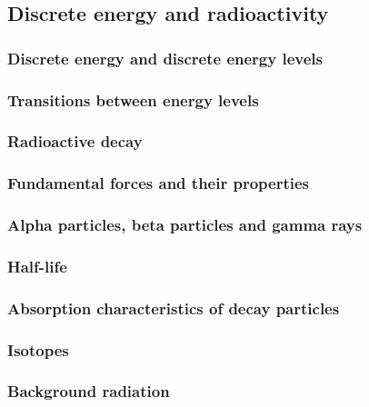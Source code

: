 \subsection{Discrete energy and radioactivity}

\subsubsection{Discrete energy and discrete energy levels}


\subsubsection{Transitions between energy levels}


\subsubsection{Radioactive decay}


\subsubsection{Fundamental forces and their properties}


\subsubsection{Alpha particles, beta particles and gamma rays}


\subsubsection{Half-life}


\subsubsection{Absorption characteristics of decay particles}


\subsubsection{Isotopes}


\subsubsection{Background radiation}


